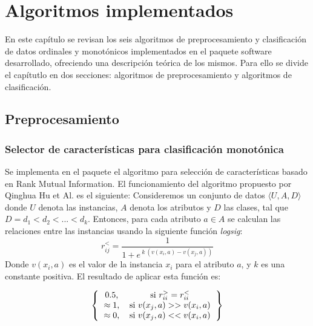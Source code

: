 
\chapter{Algoritmos implementados}

En este capítulo se revisan los seis algoritmos de preprocesamiento y clasificación de datos ordinales y monotónicos implementados en el paquete software desarrollado, ofreciendo una descripción teórica de los mismos. Para ello se divide el capítutlo en dos secciones: algoritmos de preprocesamiento y algoritmos de clasificación.
\section{Preprocesamiento}
\subsection{Selector de características para clasificación monotónica}
Se implementa en el paquete el algoritmo para selección de características \cite{hu2012feature} basado en Rank Mutual Information. El funcionamiento del algoritmo propuesto por Qinghua Hu et Al. es el siguiente: \newline
 Consideremos un conjunto de datos $\langle U, A, D \rangle$ donde $U$ denota las instancias, $A$ denota los atributos y $D$ las clases, tal que $D=d_1 < d_2 < ... < d_k$. Entonces, para cada atributo $a \in A$ se calculan las relaciones entre las instancias usando la siguiente función \textit{logsig}: 
 $$r_{ij}^{<}=\frac{1}{1+e^{\ k \ ( v(x_i,a)-v(x_j,a) )}}$$
 Donde $v(x_i,a)$ es el valor de la instancia $x_i$ para el atributo $a$, y $k$ es una constante positiva.
 El resultado de aplicar esta función es:
 
\[ 
\left \{
\begin{tabular}{cc}
0.5, & si $r_{ii}^{>}=r_{ii}^{<}$ \\
$\approx 1$, & si $v(x_j,a) >> v(x_i,a)$  \\
$\approx 0$, & si $v(x_j,a) << v(x_i,a)$ 
\end{tabular}
\right \}
\]

